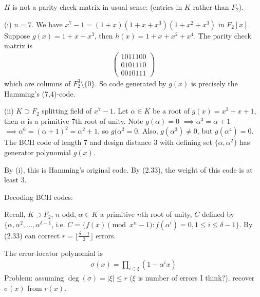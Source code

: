 \documentclass[a4paper]{article}
\begin{document}
\begin{rem}
$H$ is not a parity check matrix in usual sense: (entries in $K$ rather than $F_2$).
\end{rem}

\begin{eg}
(i) $n=7$. We have $x^7-1 = (1+x)(1+x+x^3)(1+x^2+x^3)$ in $F_2[x]$. Suppose $g(x) = 1+x+x^3$, then $h(x) = 1+x+x^2+x^4$. The parity check matrix is
\begin{equation*}
\begin{aligned}
\begin{pmatrix}
1011100\\
0101110\\
0010111
\end{pmatrix}
\end{aligned}
\end{equation*}
which are columns of $F_2^3 \setminus \{0\}$. So code generated by $g(x)$ is precisely the Hamming's (7,4)-code.

(ii) $K\supset F_2$ splitting field of $x^7-1$. Let $\alpha \in K$ be a root of $g(x) = x^3+x+1$, then $\alpha$ is a primitive 7th root of unity. Note $g(\alpha) = 0$ $\implies \alpha^3 = \alpha+1$ $\implies \alpha^6 = (\alpha+1)^2 = \alpha^2+1$, so $g(\alpha^2 = 0$. Also, $g(\alpha^3) \neq 0$, but $g(\alpha^4)=0$. The BCH code of length $7$ and design distance 3 with defining set $\{\alpha,\alpha^2\}$ has generator polynomial $g(x)$.

By (i), this is Hamming's original code. By (2.33), the weight of this code is at least 3.

Decoding BCH codes:

Recall, $K \supset F_2$, $n$ odd, $\alpha \in K$ a primitive $n$th root of unity, $C$ defined by $\{\alpha,\alpha^2,...,\alpha^{\delta-1}$, i.e. $C =\{f(x) \pmod {x^n-1}: f(\alpha^i) = 0, 1 \leq i \leq \delta-1\}$. By (2.33) can correct $r=\lfloor \frac{\delta-1}{2}\rfloor$ errors.

\begin{defi}
The error-locator polynomial is
\begin{equation*}
\begin{aligned}
\sigma(x) = \prod_{i \in \xi} (1-\alpha^i x)
\end{aligned}
\end{equation*}
Problem: assuming $\deg (\sigma) = |\xi| \leq r$ ($\xi$ is number of errors I think?), recover $\sigma(x)$ from $r(x)$.
\end{defi}
\end{eg}
\end{document}
